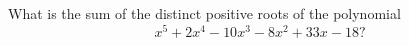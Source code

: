What is the sum of the distinct positive roots of the polynomial
\[
x^5+2x^4-10x^3-8x^2+33x-18 ?
\]
